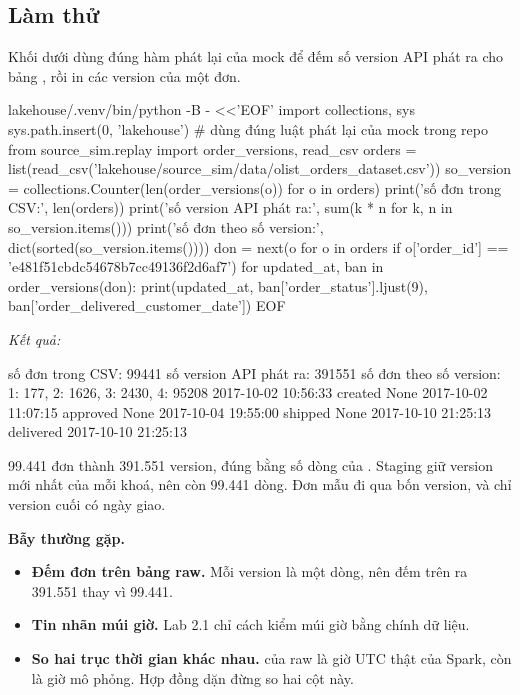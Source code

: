 \subsection{Làm thử}

Khối dưới dùng đúng hàm phát lại của mock để đếm số version API phát ra cho bảng , rồi in các version của một đơn.

\begin{codeblock}
lakehouse/.venv/bin/python -B - <<'EOF'
import collections, sys
sys.path.insert(0, 'lakehouse')  # dùng đúng luật phát lại của mock trong repo
from source_sim.replay import order_versions, read_csv
orders = list(read_csv('lakehouse/source_sim/data/olist_orders_dataset.csv'))
so_version = collections.Counter(len(order_versions(o)) for o in orders)
print('số đơn trong CSV:', len(orders))
print('số version API phát ra:', sum(k * n for k, n in so_version.items()))
print('số đơn theo số version:', dict(sorted(so_version.items())))
don = next(o for o in orders if o['order_id'] == 'e481f51cbdc54678b7cc49136f2d6af7')
for updated_at, ban in order_versions(don):
    print(updated_at, ban['order_status'].ljust(9),
          ban['order_delivered_customer_date'])
EOF
\end{codeblock}
\textit{Kết quả:}
\begin{codeblock}
số đơn trong CSV: 99441
số version API phát ra: 391551
số đơn theo số version: {1: 177, 2: 1626, 3: 2430, 4: 95208}
2017-10-02 10:56:33 created   None
2017-10-02 11:07:15 approved  None
2017-10-04 19:55:00 shipped   None
2017-10-10 21:25:13 delivered 2017-10-10 21:25:13
\end{codeblock}

99.441 đơn thành 391.551 version, đúng bằng số dòng của . Staging giữ version mới nhất của mỗi khoá, nên  còn 99.441 dòng. Đơn mẫu đi qua bốn version, và chỉ version cuối có ngày giao.

\begin{luuy}
\textbf{Bẫy thường gặp.}
\begin{itemize}
  \item \textbf{Đếm đơn trên bảng raw.} Mỗi version là một dòng, nên đếm trên  ra 391.551 thay vì 99.441.
  \item \textbf{Tin nhãn múi giờ.} Lab 2.1 chỉ cách kiểm múi giờ bằng chính dữ liệu.
  \item \textbf{So hai trục thời gian khác nhau.}  của raw là giờ UTC thật của Spark, còn  là giờ mô phỏng. Hợp đồng dặn đừng so hai cột này.
\end{itemize}
\end{luuy}

